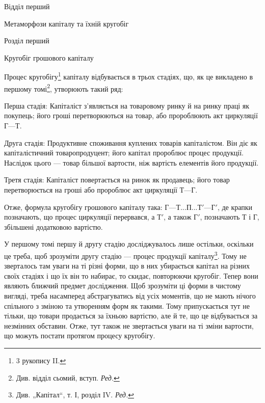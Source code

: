 \parcont{}  %
Відділ перший

Метаморфози капіталу та їхній кругобіг

Розділ перший

Кругобіг грошового капіталу

Процес кругобігу\footnote{
3 рукопису II.
} капіталу відбувається в трьох стадіях, що, як
це викладено в першому томі\footnote*{
Див. відділ сьомий, вступ. \emph{Ред.}
}, утворюють такий ряд:

Перша стадія: Капіталіст з’являється на товаровому ринку й на
ринку праці як покупець; його гроші перетворюються на товар, або пророблюють
акт циркуляції $Г — Т$.

Друга стадія: Продуктивне споживання куплених товарів капіталістом.
Він діє як капіталістичний товаропродуцент; його капітал пророблює
процес продукції. Наслідок цього — товар більшої вартости, ніж
вартість елементів його продукції.

Третя стадія: Капіталіст повертається на ринок як продавець; його
товар перетворюється на гроші або пророблює акт циркуляції $Т — Г$.

Отже, формула кругобігу грошового капіталу така: $Г — Т... П... Т' —
Г'$, де крапки позначають, що процес циркуляції перервався, а $Т'$, а
також $Г'$, позначають Т і Г, збільшені додатковою вартістю.

У першому томі першу й другу стадію досліджувалось лише остільки,
оскільки це треба, щоб зрозуміти другу стадію — процес продукції капіталу\footnote*{
Див. „Капітал“, т. І, розділ IV. \emph{Ред.}
}.
Тому не зверталось там уваги на ті різні форми, що в них убирається
капітал на різних своїх стадіях і що їх він то набирає, то скидає,
повторюючи кругобіг. Тепер вони являють ближчий предмет дослідження.
Щоб зрозуміти ці форми в чистому вигляді, треба насамперед абстрагуватись
від усіх моментів, що не мають нічого спільного з зміною та
утворенням форм як такими. Тому припускається тут не тільки, що товари
продається за їхньою вартістю, але й те, що це відбувається за
незмінних обставин. Отже, тут також не звертається уваги на ті зміни
вартости, що можуть постати протягом процесу кругобігу.
